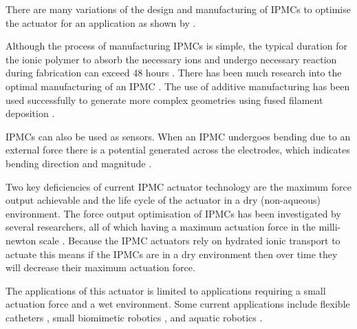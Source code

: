 There are many variations of the design and manufacturing of IPMCs to optimise the actuator for an application as shown by \cite{Shahinpoor2016}.

Although the process of manufacturing IPMCs is simple, the typical duration for the ionic polymer to absorb the necessary ions and undergo necessary reaction during fabrication can exceed 48 hours \cite{Ma2020a}. There has been much research into the optimal manufacturing of an IPMC \citep{Homma1999,Liu1992,Shahinpoor2016}. The use of additive manufacturing has been used successfully to generate more complex geometries using fused filament deposition \citep{Carrico2015}.

IPMCs can also be used as sensors. When an IPMC undergoes bending due to an external force there is a potential generated across the electrodes, which indicates bending direction and magnitude \citep{Shahinpoor2004}.

Two key deficiencies of current IPMC actuator technology are the maximum force output achievable and the life cycle of the actuator in a dry (non-aqueous) environment. The force output optimisation of IPMCs has been investigated by several researchers, all of which having a maximum actuation force in the milli-newton scale \citep{Akle2004,Xu2014,Shahinpoor2004}. Because the IPMC actuators rely on hydrated ionic transport to actuate this means if the IPMCs are in a dry environment then over time they will decrease their maximum actuation force.

The applications of this actuator is limited to applications requiring a small actuation force and a wet environment. Some current applications include flexible catheters \citep{Guo1994}, small biomimetic robotics \citep{Kodaira2019,Chang2013}, and aquatic robotics \citep{Hubbard2014,Khawwaf2019}.


